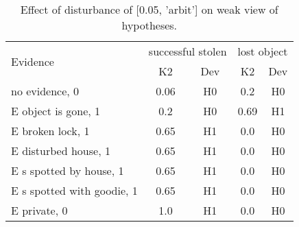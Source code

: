 \begin{table}\begin{tabular}{l|cc|cc}\toprule\multirow{2}{*}{Evidence} & \multicolumn{2}{c}{successful stolen}& \multicolumn{2}{c}{lost object}\\& {K2} & {Dev}& {K2} & {Dev}\\\midrule
no evidence, 0 & \cellcolor{Bittersweet}0.06&\cellcolor{Bittersweet}H0&\cellcolor{Bittersweet}0.2&\cellcolor{Bittersweet}H0\\E object is gone, 1 & \cellcolor{Bittersweet}0.2&\cellcolor{Bittersweet}H0&\cellcolor{Bittersweet}0.69&\cellcolor{Bittersweet}H1\\E broken lock, 1 & \cellcolor{Bittersweet}0.65&\cellcolor{Bittersweet}H1&\cellcolor{Bittersweet}0.0&\cellcolor{Bittersweet}H0\\E disturbed house, 1 & \cellcolor{Bittersweet}0.65&\cellcolor{Bittersweet}H1&\cellcolor{Bittersweet}0.0&\cellcolor{Bittersweet}H0\\E s spotted by house, 1 & \cellcolor{Bittersweet}0.65&\cellcolor{Bittersweet}H1&\cellcolor{Bittersweet}0.0&\cellcolor{Bittersweet}H0\\E s spotted with goodie, 1 & \cellcolor{Bittersweet}0.65&\cellcolor{Bittersweet}H1&\cellcolor{Bittersweet}0.0&\cellcolor{Bittersweet}H0\\E private, 0 & \cellcolor{Bittersweet}1.0&\cellcolor{Bittersweet}H1&\cellcolor{Bittersweet}0.0&\cellcolor{Bittersweet}H0\\\bottomrule\end{tabular}\caption{Effect of disturbance of [0.05, 'arbit'] on weak view of hypotheses.}\end{table}